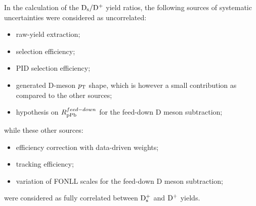 In the calculation of the ${\rm D_s}/{\rm D^+}$ yield ratios, the following sources of systematic 
uncertainties were considered as uncorrelated:
\begin{itemize}
\item raw-yield extraction;
\item selection efficiency;
\item PID selection efficiency;
\item generated D-meson $p_{\rm T}$ shape, which is however a small contribution as compared to the other sources;
\item hypothesis on $R_{\rm pPb}^{feed-down}$ for the feed-down D meson subtraction;
\end{itemize}
while these other sources:
\begin{itemize}
\item efficiency correction with data-driven weights;
\item tracking efficiency;
\item variation of FONLL scales for the feed-down D meson subtraction;
\end{itemize} 
were considered as fully correlated between ${\rm D_s^+}$ and ${\rm D^+}$ yields.


